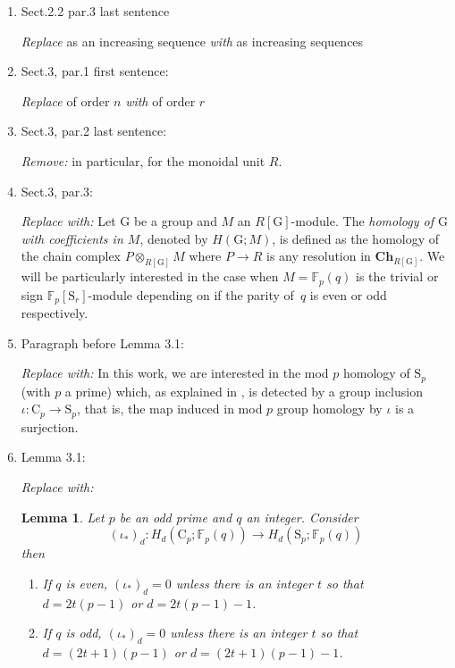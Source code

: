 \documentclass{amsart}
\newtheorem{lemma}[theorem]{Lemma}
\theoremstyle{definition}
\begin{document}
\begin{enumerate}
\item Sect.2.2 par.3 last sentence \par
\textit{Replace} as an increasing sequence \textit{with} as increasing sequences

\item Sect.3, par.1 first sentence: \par
\textit{Replace}  of order $n$ \textit{with} of order $r$

\item Sect.3, par.2 last sentence: \par
\textit{Remove:} in particular, for the monoidal unit $R$.

\item Sect.3, par.3: \par
\textit{Replace with:} Let $\mathrm G$ be a group and $M$ an $R[\mathrm G]$-module.
The \textit{homology of $\mathrm G$ with coefficients in $M$}, denoted by $H(\mathrm G; M)$, is defined as the homology of the chain complex $P \otimes_{R[\mathrm G]} M$ where $P \to R$ is any resolution in $\mathbf{Ch}_{R[\mathrm G]}$.
We will be particularly interested in the case when $M = \mathbb F_p(q)$ is the trivial or sign $\mathbb F_p[\mathrm{S}_r]$-module depending on if the parity of~$q$ is even or odd respectively.

\item Paragraph before Lemma 3.1: \par
\textit{Replace with:} In this work, we are interested in the mod $p$ homology of $\mathrm{S}_p$ (with $p$ a prime) which, as explained in \cite[Corollary~VI.1.4]{adem2004milgram}, is detected by a group inclusion $\iota \colon \mathrm{C}_p \to \mathrm{S}_p$, that is, the map induced in mod $p$ group homology by $\iota$ is a surjection.

\item Lemma 3.1: \par
\textit{Replace with:}
\begin{lemma} \label{lem: Thom's theorem}
	Let $p$ be an odd prime and $q$ an integer.
	Consider
	\begin{equation*}
	(\iota_\ast)_d \colon H_d(\mathrm{C}_p; \mathbb{F}_p(q)) \to H_d(\mathrm{S}_p; \mathbb{F}_p(q))
	\end{equation*}
	then
	\begin{enumerate}
		\item If $q$ is even, $(\iota_\ast)_d = 0$ unless there is an integer $t$ so that $d = 2t(p-1)$ or $d = 2t(p-1) - 1$.
		\item If $q$ is odd, $(\iota_\ast)_d = 0$ unless there is an integer $t$ so that $d = (2t+1)(p-1)$ or $d = (2t+1)(p-1) - 1$.
	\end{enumerate}
\end{lemma}


\end{enumerate}
\end{document}
